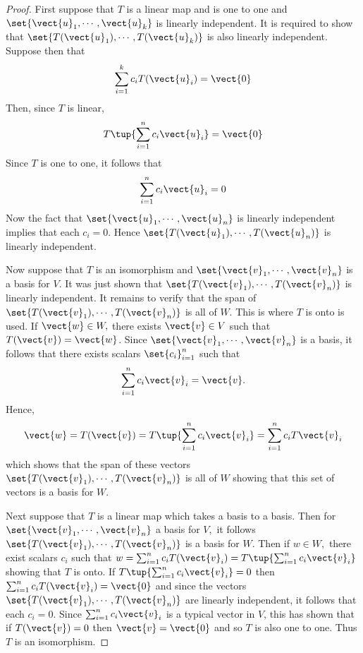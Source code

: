 \begin{proof}
First suppose that $T$ is a linear map and is one to one
and $\set{\vect{u}_{1},\cdots ,\vect{u}_{k}} $ is linearly
independent. It is required to show that $\set{T(\vect{u}_{1}),\cdots ,T(\vect{u}_{k})} $ is also linearly independent. Suppose then that 
\begin{equation*}
\sum_{i=1}^{k}c_{i}T(\vect{u}_{i})=\vect{0}
\end{equation*}
Then, since $T$ is linear, 
\begin{equation*}
T\tup{\sum_{i=1}^{n}c_{i}\vect{u}_{i}} =\vect{0}
\end{equation*}
Since $T$ is one to one, it follows that 
\begin{equation*}
\sum_{i=1}^{n}c_{i}\vect{u}_{i}=0
\end{equation*}
Now the fact that $\set{\vect{u}_{1},\cdots ,\vect{u}_{n}} $ is
linearly independent implies that each $c_{i}=0$. Hence $\set{T(\vect{u}
_{1}),\cdots ,T(\vect{u}_{n})} $ is linearly independent.

Now suppose that $T$ is an isomorphism and $\set{\vect{v}_{1},\cdots ,\vect{
v}_{n}} $ is a basis for $V$. It was just shown that $\set{T(\vect{v}
_{1}),\cdots ,T(\vect{v}_{n})} $ is linearly independent. It remains to
verify that the span of $\set{T(\vect{v}_{1}),\cdots ,T(\vect{v}_{n})} $
is all of $W$. This is where $T$ is onto is used. If $\vect{w}\in W,$ there
exists $\vect{v}\in V$ such that $T(\vect{v})=\vect{w}$. Since $\set{\vect{v}
_{1},\cdots ,\vect{v}_{n}} $ is a basis, it follows that there exists
scalars $\set{c_{i}} _{i=1}^{n}$ such that 
\begin{equation*}
\sum_{i=1}^{n}c_{i}\vect{v}_{i}=\vect{v}.
\end{equation*}
Hence, 
\begin{equation*}
\vect{w}=T(\vect{v})=T\tup{\sum_{i=1}^{n}c_{i}\vect{v}_{i}}
=\sum_{i=1}^{n}c_{i}T\vect{v}_{i}
\end{equation*}
which shows that the span of these vectors $\set{T(\vect{v}_{1}),\cdots ,T
(\vect{v}_{n})} $ is all of $W$ showing that this set of vectors is a
basis for $W$.

Next suppose that $T$ is a linear map which takes a basis to a basis. Then
for $\set{\vect{v}_{1},\cdots ,\vect{v}_{n}} $ a basis for $V,$ it
follows $\set{T(\vect{v}_{1}),\cdots ,T(\vect{v}_{n})} $ is a basis for $
W.$ Then if $w\in W,$ there exist scalars $c_{i}$ such that $
w=\sum_{i=1}^{n}c_{i}T(\vect{v}_{i})=T\tup{\sum_{i=1}^{n}c_{i}\vect{v}_{i}} $
showing that $T$ is onto. If $T\tup{\sum_{i=1}^{n}c_{i}\vect{v}_{i}} =0$
then $\sum_{i=1}^{n}c_{i}T(\vect{v}_{i})=\vect{0}$ and since the vectors $\set{T(\vect{v}
_{1}),\cdots ,T(\vect{v}_{n})} $ are linearly independent, it follows
that each $c_{i}=0.$ Since $\sum_{i=1}^{n}c_{i}\vect{v}_{i}$ is a typical vector in 
$V$, this has shown that if $T(\vect{v})=0$ then $\vect{v}=\vect{0}$ and so $T$ is also one to one.
Thus $T$ is an isomorphism.
\end{proof}

